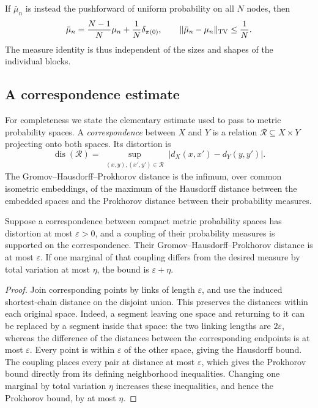 If $\bar\mu_n$ is instead the pushforward of uniform probability on
all $N$ nodes, then
\begin{equation}\label{metric:mass-error}
 \bar\mu_n=\frac{N-1}{N}\mu_n+\frac1N\delta_{\pi(0)},
 \qquad
 \|\bar\mu_n-\mu_n\|_{\rm TV}\le\frac1N.
\end{equation}
The measure identity is thus independent of the sizes and shapes of
the individual blocks.

\subsection{A correspondence estimate}

For completeness we state the elementary estimate used to pass to
metric probability spaces. A \emph{correspondence} between $X$ and
$Y$ is a relation $\mathcal R\subseteq X\times Y$ projecting onto both
spaces. Its distortion is
\[
 \operatorname{dis}(\mathcal R)
 =\sup_{\substack{(x,y),(x',y')\in\mathcal R}}
       |d_X(x,x')-d_Y(y,y')|.
\]
The Gromov--Hausdorff--Prokhorov distance is the infimum, over common
isometric embeddings, of the maximum of the Hausdorff distance
between the embedded spaces and the Prokhorov distance between their
probability measures.

\begin{lemma}\label{metric:ghp}
Suppose a correspondence between compact metric probability spaces
has distortion at most $\varepsilon>0$, and a coupling of their
probability measures is supported on the correspondence. Their
Gromov--Hausdorff--Prokhorov distance is at most $\varepsilon$.
If one marginal of that coupling differs from the desired measure
by total variation at most $\eta$, the bound is
$\varepsilon+\eta$.
\end{lemma}

\begin{proof}
Join corresponding points by links of length $\varepsilon$, and
use the induced shortest-chain distance on the disjoint union.
This preserves the distances within each original space.
Indeed, a segment leaving one space and returning to it can be
replaced by a segment inside that space: the two linking lengths
are $2\varepsilon$, whereas the difference of the distances between
the corresponding endpoints is at most $\varepsilon$.
Every point is within $\varepsilon$ of the other space, giving the
Hausdorff bound. The coupling places every pair at distance at most
$\varepsilon$, which gives the Prokhorov bound directly from its
defining neighborhood inequalities. Changing one marginal by
total variation $\eta$ increases these inequalities, and hence the
Prokhorov bound, by at most $\eta$.
\end{proof}

